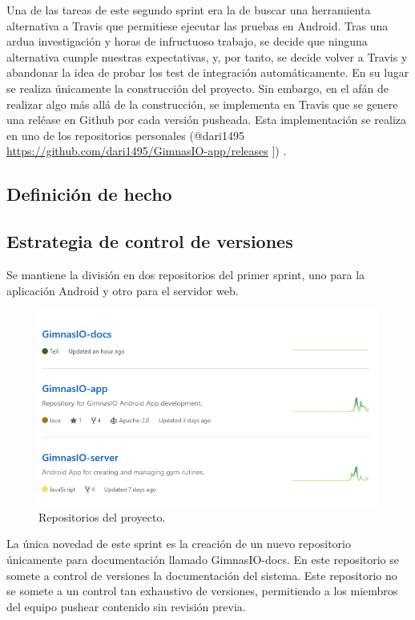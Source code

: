 \documentclass[11pt,a4paper]{report}
\begin{document}
Una de las tareas de este segundo sprint era la de buscar una herramienta alternativa a Travis que permitiese ejecutar las pruebas en Android. Tras una ardua investigación y horas de infructuoso trabajo, se decide que ninguna alternativa cumple nuestras expectativas, y, por tanto, se decide volver a Travis y abandonar la idea de probar los test de integración automáticamente. En su lugar se realiza únicamente la construcción del proyecto. Sin embargo, en el afán de realizar algo más allá de la construcción, se implementa en Travis que se genere una reléase en Github por cada versión pusheada. Esta implementación se realiza en uno de los repositorios personales (@dari1495 \url{https://github.com/dari1495/GimnasIO-app/releases} ]) .
\subsection{Definición de hecho}
\subsection{Estrategia de control de versiones}
Se mantiene la división en dos repositorios del primer sprint, uno para la aplicación Android y otro para el servidor web. 

\begin{figure}[H]
	\centering
	\includegraphics[width=1\textwidth]{graficos/repos.png}
	\caption{Repositorios del proyecto.}
	\label{fig: repos}
\end{figure}
La única novedad de este sprint es la creación de un nuevo repositorio únicamente para documentación llamado GimnasIO-docs. En este repositorio se somete a control de versiones la documentación del sistema. Este repositorio no se somete a un control tan exhaustivo de versiones, permitiendo a los miembros del equipo pushear contenido sin revisión previa.
\end{document}
